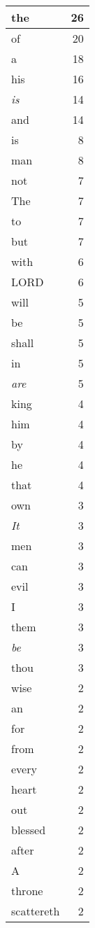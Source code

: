 \begin{center}
\begin{longtable}{l|r}
the & 26\\ \hline 
of & 20\\ \hline 
a & 18\\ \hline 
his & 16\\ \hline 
\emph{is} & 14\\ \hline 
and & 14\\ \hline 
is & 8\\ \hline 
man & 8\\ \hline 
not & 7\\ \hline 
The & 7\\ \hline 
to & 7\\ \hline 
but & 7\\ \hline 
with & 6\\ \hline 
LORD & 6\\ \hline 
will & 5\\ \hline 
be & 5\\ \hline 
shall & 5\\ \hline 
in & 5\\ \hline 
\emph{are} & 5\\ \hline 
king & 4\\ \hline 
him & 4\\ \hline 
by & 4\\ \hline 
he & 4\\ \hline 
that & 4\\ \hline 
own & 3\\ \hline 
\emph{It} & 3\\ \hline 
men & 3\\ \hline 
can & 3\\ \hline 
evil & 3\\ \hline 
I & 3\\ \hline 
them & 3\\ \hline 
\emph{be} & 3\\ \hline 
thou & 3\\ \hline 
wise & 2\\ \hline 
an & 2\\ \hline 
for & 2\\ \hline 
from & 2\\ \hline 
every & 2\\ \hline 
heart & 2\\ \hline 
out & 2\\ \hline 
blessed & 2\\ \hline 
after & 2\\ \hline 
A & 2\\ \hline 
throne & 2\\ \hline 
scattereth & 2\\ \hline 

\end{longtable}
\end{center}
